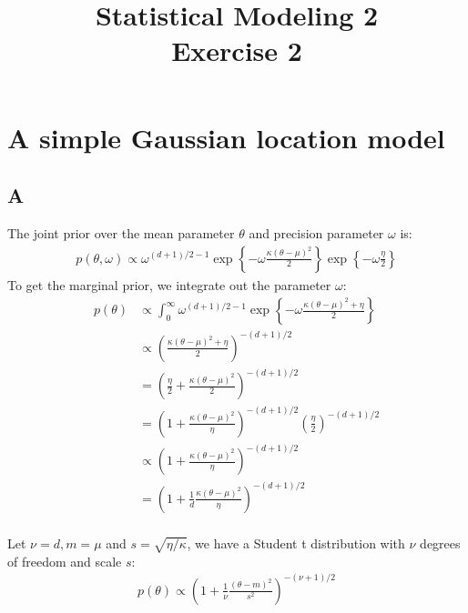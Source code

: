 \documentclass{article}
\title{Statistical Modeling 2 \\ Exercise 2}
\begin{document}
\maketitle
\section{A simple Gaussian location model}
\subsection*{A}
The joint prior over the mean parameter \(\theta\) and precision parameter \(\omega\) is:
\begin{align*}
p(\theta, \omega) \propto \omega^{(d+1)/2-1} \exp \left\lbrace -\omega\frac{\kappa(\theta-\mu)^2}{2}\right\rbrace \exp \left\lbrace -\omega\frac{\eta}{2} \right\rbrace
\end{align*}
To get the marginal prior, we integrate out the parameter \(\omega\):
\begin{align*}
p(\theta) &\propto \int_0^{\infty} \omega^{(d+1)/2-1} \exp \left\lbrace -\omega\frac{\kappa(\theta-\mu)^2 + \eta}{2}\right\rbrace\\
&\propto \left(\frac{\kappa(\theta-\mu)^2 + \eta}{2}\right)^{-(d+1)/2} \\
&= \left(\frac{\eta}{2} + \frac{\kappa(\theta-\mu)^2}{2}\right)^{-(d+1)/2} \\
&= \left(1 + \frac{\kappa(\theta-\mu)^2}{\eta}\right)^{-(d+1)/2} \left(\frac{\eta}{2}\right)^{-(d+1)/2} \\
&\propto \left(1 + \frac{\kappa(\theta-\mu)^2}{\eta}\right)^{-(d+1)/2}\\
&=\left(1 + \frac{1}{d}\frac{\kappa(\theta-\mu)^2}{\eta}\right)^{-(d+1)/2}\\
\end{align*}

Let \(\nu = d, m = \mu\) and \(s = \sqrt{\eta/\kappa}\), we have a Student t distribution with \(\nu\) degrees of freedom and scale \(s\):
\begin{align*}
p(\theta) \propto \left(1 + \frac{1}{\nu}\frac{(\theta-m)^2}{s^2}\right)^{-(\nu+1)/2}\\
\end{align*}
\end{document}
